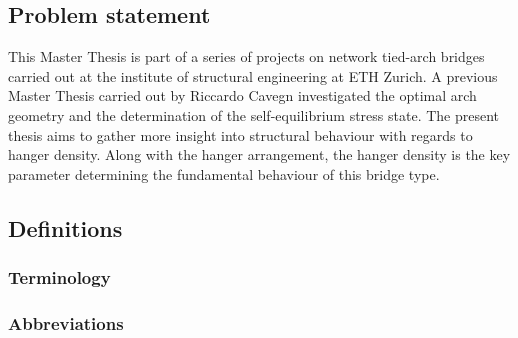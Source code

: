 \subsection{Problem statement} \label{sec:int_prob}
This Master Thesis is part of a series of projects on network tied-arch bridges carried out at the institute of structural engineering at ETH Zurich. A previous Master Thesis carried out by Riccardo Cavegn investigated the optimal arch geometry and the determination of the self-equilibrium stress state. The present thesis aims to gather more insight into structural behaviour with regards to hanger density.
Along with the hanger arrangement, the hanger density is the key parameter determining the fundamental behaviour of this bridge type.\\

\subsection{Definitions} \label{sec:int_def}
\subsubsection{Terminology} 
\subsubsection{Abbreviations}